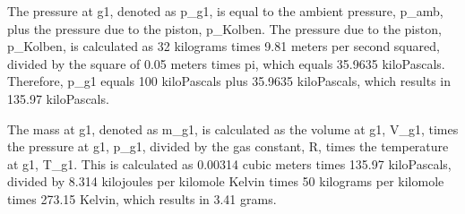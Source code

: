 The pressure at g1, denoted as p_{g1}, is equal to the ambient pressure, p_{amb}, plus the pressure due to the piston, p_{Kolben}. The pressure due to the piston, p_{Kolben}, is calculated as 32 kilograms times 9.81 meters per second squared, divided by the square of 0.05 meters times pi, which equals 35.9635 kiloPascals. Therefore, p_{g1} equals 100 kiloPascals plus 35.9635 kiloPascals, which results in 135.97 kiloPascals.

The mass at g1, denoted as m_{g1}, is calculated as the volume at g1, V_{g1}, times the pressure at g1, p_{g1}, divided by the gas constant, R, times the temperature at g1, T_{g1}. This is calculated as 0.00314 cubic meters times 135.97 kiloPascals, divided by 8.314 kilojoules per kilomole Kelvin times 50 kilograms per kilomole times 273.15 Kelvin, which results in 3.41 grams.